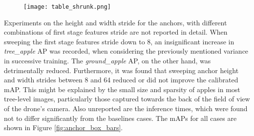 \documentclass[journal]{IEEEtran}
\begin{document}


\begin{figure}[H]
    \centering
    \texttt{[image: table\_shrunk.png]}
    \label{fig:table_shrunk}
\end{figure}


\setcounter{table}{3}



Experiments on the height and width stride for the anchors, with different combinations of first stage features stride are not reported in detail. When sweeping the first stage features stride down to 8, an insignificant increase in \textit{tree\_apple} AP was recorded, when considering the previously mentioned variance in successive training. The \textit{ground\_apple} AP, on the other hand, was detrimentally reduced. Furthermore, it was found that sweeping anchor height and width strides between 8 and 64 reduced or did not improve the calibrated mAP. This might be explained by the small size and sparsity of apples in most tree-level images, particularly those captured towards the back of the field of view of the drone's camera. Also unreported are the inference times, which were found not to differ significantly from the baselines cases. The mAPs for all cases are shown in Figure \ref{fig:anchor_box_bars}.
\end{document}

